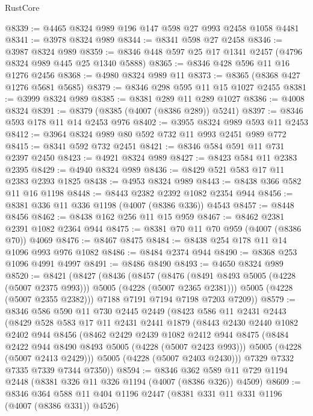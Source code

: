 \begin{lexlean}{RustCore}
\begin{coremodule}
@8339 := @4465 @8324 @989 @196 @147 @598 @27 @993 @2458 @1058 @4481
@8341 := @3978 @8324 @989
@8344 := @8341 @598 @27 @2458
@8346 := @3987 @8324 @989
@8359 := @8346 @448 @597 @25 @17 @1341 @2457 (@4796 @8324 @989 @445 @25 @1340 @5888)
@8365 := @8346 @428 @596 @11 @16 @1276 @2456
@8368 := @4980 @8324 @989 @11
@8373 := @8365 (@8368 @427 @1276 @5681 @5685)
@8379 := @8346 @298 @595 @11 @15 @1027 @2455
@8381 := @3999 @8324 @989
@8385 := @8381 @289 @11 @289 @1027
@8386 := @4008 @8324
@8391 := @8379 (@8385 (@4007 (@8386 @289)) @5241)
@8397 := @8346 @593 @178 @11 @14 @2453 @976
@8402 := @3955 @8324 @989 @593 @11 @2453
@8412 := @3964 @8324 @989 @80 @592 @732 @11 @993 @2451 @989 @772
@8415 := @8341 @592 @732 @2451
@8421 := @8346 @584 @591 @11 @731 @2397 @2450
@8423 := @4921 @8324 @989
@8427 := @8423 @584 @11 @2383 @2395
@8429 := @4940 @8324 @989
@8436 := @8429 @521 @583 @17 @11 @2383 @2393 @1825
@8438 := @4953 @8324 @989
@8443 := @8438 @366 @582 @11 @16 @1198
@8448 := @8443 @2382 @2392 @1082 @2354 @944
@8456 := @8381 @336 @11 @336 @1198 (@4007 (@8386 @336)) @4543
@8457 := @8448 @8456
@8462 := @8438 @162 @256 @11 @15 @959
@8467 := @8462 @2381 @2391 @1082 @2364 @944
@8475 := @8381 @70 @11 @70 @959 (@4007 (@8386 @70)) @4069
@8476 := @8467 @8475
@8484 := @8438 @254 @178 @11 @14 @1096 @993 @976 @1082
@8486 := @8484 @2374 @944
@8490 := @8368 @253 @1096 @4991 @4997
@8491 := @8486 @8490
@8493 := @4650 @8324 @989
@8520 := @8421
    (@8427
      (@8436
        (@8457
          (@8476 (@8491 @8493 @5005 (@4228 (@5007 @2375 @993))) @5005 (@4228 (@5007 @2365 @2381)))
          @5005
          (@4228 (@5007 @2355 @2382)))
        @7188
        @7191
        @7194
        @7198
        @7203
        @7209))
@8579 := @8346
    @586
    @590
    @11
    @730
    @2445
    @2449
    (@8423
      @586
      @11
      @2431
      @2443
      (@8429
        @528
        @583
        @17
        @11
        @2431
        @2441
        @1879
        (@8443
          @2430
          @2440
          @1082
          @2402
          @944
          @8456
          (@8462
            @2429
            @2439
            @1082
            @2412
            @944
            @8475
            (@8484 @2422 @944 @8490 @8493 @5005 (@4228 (@5007 @2423 @993)))
            @5005
            (@4228 (@5007 @2413 @2429)))
          @5005
          (@4228 (@5007 @2403 @2430)))
        @7329
        @7332
        @7335
        @7339
        @7344
        @7350))
@8594 := @8346 @362 @589 @11 @729 @1194 @2448 (@8381 @326 @11 @326 @1194 (@4007 (@8386 @326)) @4509)
@8609 := @8346 @364 @588 @11 @404 @1196 @2447 (@8381 @331 @11 @331 @1196 (@4007 (@8386 @331)) @4526)

\end{coremodule}
\end{lexlean}
